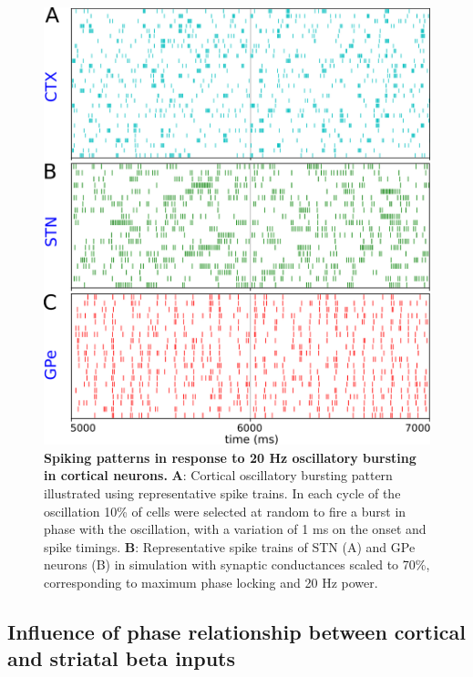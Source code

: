 \begin{figure}
\centering
\includegraphics[width=\textwidth]{ch_detailed_model/figs_split/fig_exogenous_ctx-resonance-example_B-rasters.png}
\caption{
\textbf{Spiking patterns in response to 20 Hz oscillatory bursting in cortical neurons.}
\textbf{A}: Cortical oscillatory bursting pattern illustrated using representative spike trains. In each cycle of the oscillation 10\% of cells were selected at random to fire a burst in phase with the oscillation, with a variation of 1 ms on the onset and spike timings.
\textbf{B}: Representative spike trains of STN (A) and GPe neurons (B) in simulation with synaptic conductances scaled to 70\%, corresponding to maximum phase locking and 20 Hz power.
}
\label{fig:exogenous_ctx-resonance-example_B-rasters}
\end{figure}

%
%
\subsection{Influence of phase relationship between cortical and striatal beta inputs}
\label{sec:patterned-loop_sweep-ctx-msn-phase}
%
%
%
%
%
%
%
%
%

